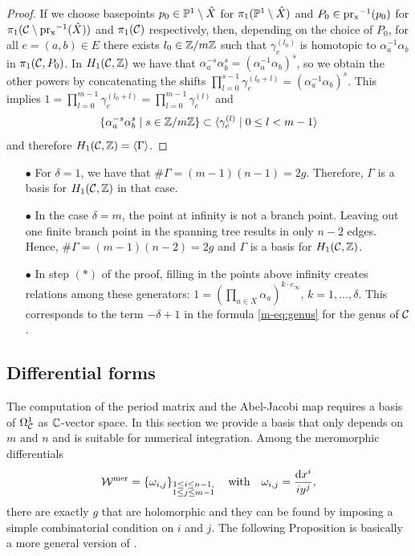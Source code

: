 \documentclass[main.tex]{subfiles}
\begin{document}
\begin{proof}
  If we choose basepoints $p_0 \in \P^1 \setminus \hat{X}$ for $\pi_1(\P^1 \setminus \hat{X})$ and $P_0 \in \pr^{-1}(p_0)$ for $\pi_1(\cu \setminus \pr^{-1}(\hat{X}))$ and $\pi_1(\cu)$ respectively, then,
  depending on the choice of $P_0$, for all $e = (a,b) \in E$ there exists $l_0 \in \Z/m\Z$ such that $\gamma_e^{(l_0)}$ is homotopic to $\alpha_a^{-1} \alpha_b$ in $\pi_1(\cu,P_0)$.
   In $\homo$ we have that $\alpha_a^{-s}\alpha_b^{s} = ( \alpha_a^{-1}\alpha_b)^s$, so we obtain the other powers by concatenating
  the shifts $\prod_{l = 0}^{s-1} \gamma_e^{(l_0+l)} = (\alpha_a^{-1}\alpha_b)^s$.
  This implies $1 = \prod_{l = 0}^{m-1} \gamma_e^{(l_0+l)} = \prod_{l = 0}^{m-1} \gamma_e^{(l)}$ and
   $$\{  \alpha_a^{-s} \alpha_b^{s}  \mid  s \in \Z/m\Z  \} \subset  \langle  \gamma_e^{(l)} 
  \mid  0 \le l < m-1 \rangle$$ and therefore $\homo = \langle  \Gamma  \rangle$.
  \end{proof}

  \begin{rmk}
  \begin{itemize}
   \item[$\bullet$] For $\delta = 1$, we have that $\# \Gamma = (m-1)(n-1) = 2g$. Therefore, $\Gamma$ is a basis for $\homo$ in that case.
   \item[$\bullet$] In the case $\delta = m$, the point at infinity is not a branch point. Leaving out one finite branch point in the spanning tree results in only $n-2$ edges. Hence,
   $\# \Gamma = (m-1)(n-2) = 2g$ and $\Gamma$ is a basis for $\homo$.
   \item[$\bullet$] In step $(*)$ of the proof, filling in the points above infinity creates relations among
  these generators:
  $1 = (\prod_{a \in X} \alpha_a)^{k \cdot e_{\infty}}$, $k = 1,\dots,\delta$. This corresponds to the term $-\delta+1$ in the formula \eqref{m-eq:genus} for the genus of $\cu$. 
  \end{itemize}
  \end{rmk}

\subsection{Differential forms}\label{subsec:diff_forms}

    The computation of the period matrix and the Abel-Jacobi map requires a basis of $\hd$ as $\C$-vector space. In this section we provide a basis that only
   depends on $m$ and $n$ and is suitable for numerical integration. \abstand
    Among the meromorphic differentials
    \begin{align*}
 \WM = \left\{  \omega_{i,j}   \right\}_{\substack{1 \le i \le n-1, \\ 1 \le j \le m-1}} \quad \text{with} \quad \omega_{i,j} = \frac{ \dx^i}{i y^j},
  \end{align*}
  there are exactly $g$ that are holomorphic  and they can be found by imposing a simple combinatorial condition on $i$ and $j$.
 The following Proposition is basically a more general version of
  \cite[Proposition 2]{CT1996}.
\end{document}

